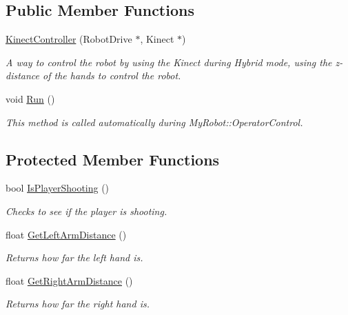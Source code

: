 \subsection*{\-Public \-Member \-Functions}
\begin{DoxyCompactItemize}
\item 
\hyperlink{class_kinect_controller_a252061547a62408c3113508ef71d0c84}{\-Kinect\-Controller} (\-Robot\-Drive $\ast$, \-Kinect $\ast$)
\begin{DoxyCompactList}\small\item\em \-A way to control the robot by using the \-Kinect during \-Hybrid mode, using the z-\/distance of the hands to control the robot. \end{DoxyCompactList}\item 
void \hyperlink{class_kinect_controller_a7252c3d29afaf83fa742925b2f23da0c}{\-Run} ()
\begin{DoxyCompactList}\small\item\em \-This method is called automatically during \-My\-Robot\-::\-Operator\-Control. \end{DoxyCompactList}\end{DoxyCompactItemize}
\subsection*{\-Protected \-Member \-Functions}
\begin{DoxyCompactItemize}
\item 
bool \hyperlink{class_kinect_controller_a82c71f65b503923c313980d26f5f1c86}{\-Is\-Player\-Shooting} ()
\begin{DoxyCompactList}\small\item\em \-Checks to see if the player is shooting. \end{DoxyCompactList}\item 
float \hyperlink{class_kinect_controller_a8f5559d173f04d6e079af3bf5b938bac}{\-Get\-Left\-Arm\-Distance} ()
\begin{DoxyCompactList}\small\item\em \-Returns how far the left hand is. \end{DoxyCompactList}\item 
float \hyperlink{class_kinect_controller_ab1a5a3007766a1833441a2c94248444a}{\-Get\-Right\-Arm\-Distance} ()
\begin{DoxyCompactList}\small\item\em \-Returns how far the right hand is. \end{DoxyCompactList}\end{DoxyCompactItemize}
